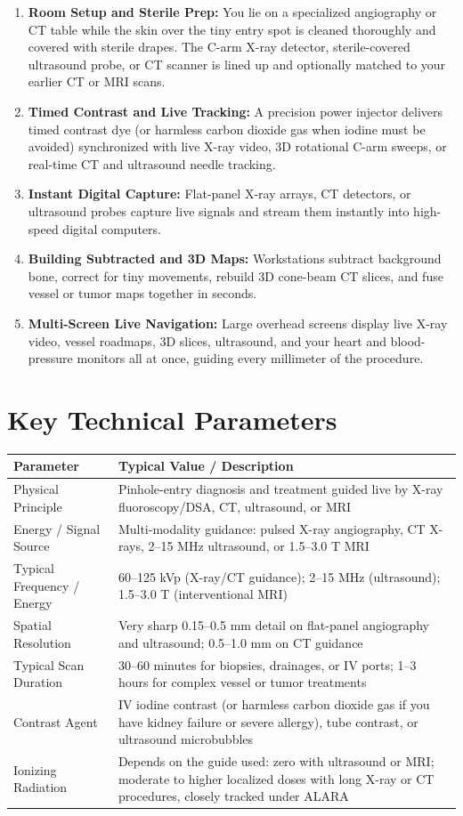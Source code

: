 \begin{enumerate}
    \item \textbf{Room Setup and Sterile Prep:} You lie on a specialized angiography or CT table while the skin over the tiny entry spot is cleaned thoroughly and covered with sterile drapes. The C-arm X-ray detector, sterile-covered ultrasound probe, or CT scanner is lined up and optionally matched to your earlier CT or MRI scans.
    \item \textbf{Timed Contrast and Live Tracking:} A precision power injector delivers timed contrast dye (or harmless carbon dioxide gas when iodine must be avoided) synchronized with live X-ray video, 3D rotational C-arm sweeps, or real-time CT and ultrasound needle tracking.
    \item \textbf{Instant Digital Capture:} Flat-panel X-ray arrays, CT detectors, or ultrasound probes capture live signals and stream them instantly into high-speed digital computers.
    \item \textbf{Building Subtracted and 3D Maps:} Workstations subtract background bone, correct for tiny movements, rebuild 3D cone-beam CT slices, and fuse vessel or tumor maps together in seconds.
    \item \textbf{Multi-Screen Live Navigation:} Large overhead screens display live X-ray video, vessel roadmaps, 3D slices, ultrasound, and your heart and blood-pressure monitors all at once, guiding every millimeter of the procedure.
\end{enumerate}

\section{Key Technical Parameters}

\noindent\begin{tabularx}{\textwidth}{@{}l X@{}}
\toprule
\textbf{Parameter} & \textbf{Typical Value / Description} \\
\midrule
Physical Principle & Pinhole-entry diagnosis and treatment guided live by X-ray fluoroscopy/DSA, CT, ultrasound, or MRI \\
Energy / Signal Source & Multi-modality guidance: pulsed X-ray angiography, CT X-rays, 2--15 MHz ultrasound, or 1.5--3.0 T MRI \\
Typical Frequency / Energy & 60--125 kVp (X-ray/CT guidance); 2--15 MHz (ultrasound); 1.5--3.0 T (interventional MRI) \\
Spatial Resolution & Very sharp 0.15--0.5 mm detail on flat-panel angiography and ultrasound; 0.5--1.0 mm on CT guidance \\
Typical Scan Duration & 30--60 minutes for biopsies, drainages, or IV ports; 1--3 hours for complex vessel or tumor treatments \\
Contrast Agent & IV iodine contrast (or harmless carbon dioxide gas if you have kidney failure or severe allergy), tube contrast, or ultrasound microbubbles \\
Ionizing Radiation & Depends on the guide used: zero with ultrasound or MRI; moderate to higher localized doses with long X-ray or CT procedures, closely tracked under ALARA \\
\bottomrule
\end{tabularx}

